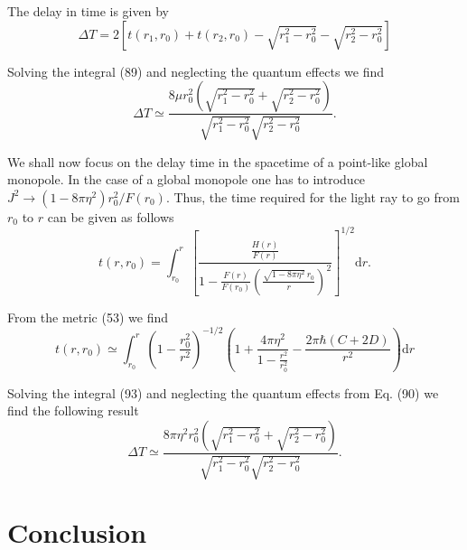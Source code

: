 \documentclass[preprint,superscriptaddress,amsfonts,amssymb,amsmath,showpacs]{revtex4}
\begin{document}
The delay in time is given by \cite{weinberg}
\begin{equation}
\Delta T=2\left[t(r_1,r_0)+t(r_2,r_0)-\sqrt{r_1^2-r_0^2}-\sqrt{r_2^2-r_0^2} \right]
\end{equation}

Solving the integral (89) and neglecting the quantum effects we find 
\begin{equation}
\Delta T\simeq \frac{8 \mu r_0^2 \left(\sqrt{r_1^2-r_0^2} +\sqrt{r_2^2-r_0^2}   \right)}{\sqrt{r_1^2-r_0^2}  \sqrt{r_2^2-r_0^2} }.
\end{equation}

We shall now focus on the delay time in the spacetime of a point-like global monopole. In the case of a global monopole one has to introduce $J^2\to (1-8 \pi \eta^2) r_0^2/F(r_0)$. Thus, the time required for the light ray to go from $r_0$ to $r$ can be given as follows
\begin{equation}
t(r,r_0)=\int_{r_0}^{r} \left[\frac{\frac{H(r)}{F(r)}}{1-\frac{F(r)}{F(r_0)}\left(\frac{\sqrt{1-8 \pi\eta^2}\, r_0}{r} \right)^2}  \right]^{1/2} \mathrm{d}r.
\end{equation}

From the metric (53) we find
\begin{equation}
t(r,r_0)\simeq \int_{r_0}^{r}\left( 1-\frac{r_0^2}{r^2} \right)^{-1/2}\left(1+\frac{4 \pi \eta^2 }{1-\frac{r^2}{r_0^2}}-\frac{2 \pi \hbar (C+2D)}{r^2} \right) \mathrm{d}r
\end{equation}

Solving the integral (93) and neglecting the quantum effects from Eq. (90) we find the following result
\begin{equation}
\Delta T\simeq \frac{8 \pi \eta^2 r_0^2 \left(\sqrt{r_1^2-r_0^2} +\sqrt{r_2^2-r_0^2}   \right)}{\sqrt{r_1^2-r_0^2}  \sqrt{r_2^2-r_0^2} }.
\end{equation}

\section{Conclusion }
\end{document}
